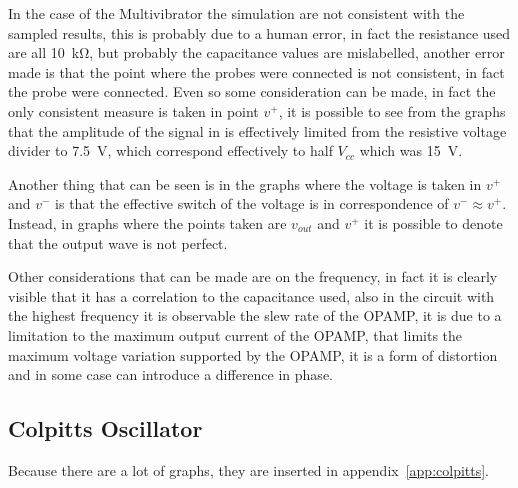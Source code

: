 \documentclass[a4paper, twocolumn]{article}
\begin{document}
In the case of the Multivibrator the simulation are not consistent with the sampled results, this is probably due to a human error, in fact the resistance used are all \SI{10}{\kilo\ohm}, but probably the capacitance values are mislabelled, another error made is that the point where the probes were connected is not consistent, in fact the probe were connected. Even so some consideration can be made, in fact the only consistent measure is taken in point $v^+$, it is possible to see from the graphs that the amplitude of the signal in  is effectively limited from the resistive voltage divider to \SI{7.5}{\volt}, which correspond effectively to half $V_{cc}$ which was \SI{15}{\volt}.

Another thing that can be seen is in the graphs where the voltage is taken in $v^+$ and $v^-$ is that the effective switch of the voltage is in correspondence of $v^-\approx v^+$. Instead, in graphs where the points taken are $v_{out}$ and $v^+$ it is possible to denote that the output wave is not perfect.

Other considerations that can be made are on the frequency, in fact it is clearly visible that it has a correlation to the capacitance used, also in the circuit with the highest frequency it is observable the slew rate of the OPAMP, it is due to a limitation to the maximum output current of the OPAMP, that limits the maximum voltage variation supported by the OPAMP, it is a form of distortion and in some case can introduce a difference in phase.



\subsection{Colpitts Oscillator}

Because there are a lot of graphs, they are inserted in appendix~\ref{app:colpitts}.
\end{document}
